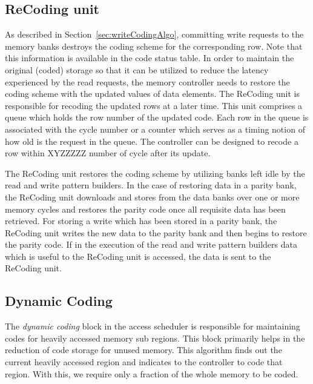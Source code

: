 \subsection{ReCoding unit}
\label{sec:recoding}
As described in Section~\ref{sec:writeCodingAlgo}, committing write requests to the memory banks destroys the coding scheme for the corresponding row. Note that this information is available in the code status table. In order to maintain the original (coded) storage so that it can be utilized to reduce the latency experienced by the read requests, the memory controller needs to restore the coding scheme with the updated values of data elements.
The ReCoding unit is responsible for recoding the updated rows at a later time. This unit  comprises a queue which holds the row number of the updated code. Each row in the queue is associated with the cycle number or a counter which serves as a timing notion of how old is the request in the queue. The controller can be designed to recode a row within {\color{red}XYZZZZZ} number of cycle after its update. 

The ReCoding unit restores the coding scheme by utilizing banks left idle by the read and write pattern builders. In the case of restoring data in a parity bank, the ReCoding unit downloads and stores from the data banks over one or more memory cycles and restores the parity code once all requisite data has been retrieved. For storing a write which has been stored in a parity bank, the ReCoding unit writes the new data to the parity bank and then begins to restore the parity code. If in the execution of the read and write pattern builders data which is useful to the ReCoding unit is accessed, the data is sent to the ReCoding unit.


\subsection{Dynamic Coding}
\label{sec:dynamicCoding}
The {\em dynamic coding} block in the access scheduler is responsible for 
maintaining codes for heavily accessed memory sub regions. This block primarily 
helps in the reduction of code storage for unused memory. This algorithm finds 
out the current heavily accessed region and indicates to the controller to code 
that region. With this, we require only a fraction of the whole memory to be 
coded.  

